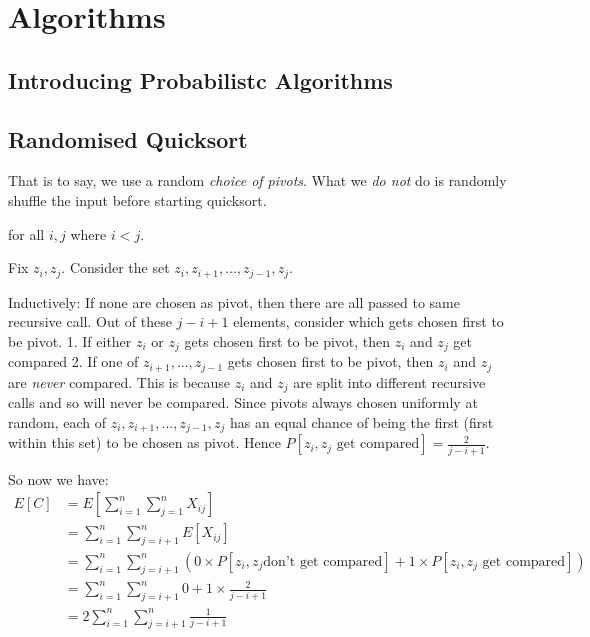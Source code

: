 
\chapter{Algorithms}



\section{Introducing Probabilistc Algorithms}




\section{Randomised Quicksort}



That is to say, we use a random \textit{choice of pivots}. 
What we \textit{do not} do is randomly shuffle the input before starting quicksort. 




for all $i,j$ where $i < j$. 

Fix $z_i, z_j$. Consider the set $z_i, z_{i+1}, ..., z_{j-1}, z_{j}$. 

Inductively: If none are chosen as pivot, then there are all passed to same recursive call.
Out of these $j - i + 1$ elements, consider which gets chosen first to be pivot. 
1. If either $z_i$ or $z_j$ gets chosen first to be pivot, then $z_i$ and $z_j$ get compared 
2. If one of $z_{i+1}, ..., z_{j-1}$ gets chosen first to be pivot, then $z_i$ and $z_j$ are \textit{never} compared. 
This is because $z_i$ and $z_j$ are split into different recursive calls and so will never be compared. 
Since pivots always chosen uniformly at random, each of $z_i, z_{i+1}, ..., z_{j-1}, z_{j}$ 
has an equal chance of being the first (first within this set) to be chosen as pivot. 
Hence $P[z_i, z_j \text{ get compared}]  = \frac{2}{j-i+1}$. 

\frmrule 

So now we have:
\[ 
\begin{array}{ll}
 E[C] & = E[\sum^{n}_{i=1} \sum^{n}_{j=1} X_{ij}]  \\
  &= \sum^{n}_{i=1} \sum^{n}_{j=i+1} E[X_{ij}]\\
  &= \sum^{n}_{i=1} \sum^{n}_{j=i+1} 
  (0 \times P[z_i, z_j \text{don't get compared}] +  1 \times P[z_i, z_j \text{ get compared}]) \\
  &= \sum^{n}_{i=1} \sum^{n}_{j=i+1} 0 + 1 \times \frac{2}{j-i+1}  \\
  &= 2\sum^{n}_{i=1} \sum^{n}_{j=i+1} \frac{1}{j-i+1}  \\
\end{array}
\]

